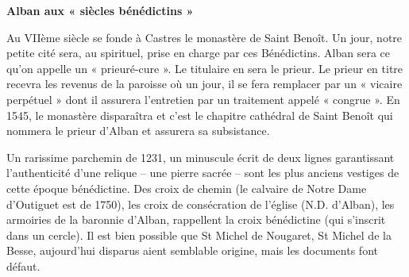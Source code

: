 
\thispagestyle{plain}

\vspace*{12mm}

\begin{center}
    {\Large\bfseries Alban aux « siècles bénédictins »}
\end{center}

\vspace{18mm}

\noindent
Au VIIème siècle se fonde à Castres le monastère de Saint Benoît.
Un jour, notre petite cité sera, au spirituel, prise en charge par
ces Bénédictins. Alban sera ce qu'on appelle un « prieuré-cure ».
Le titulaire en sera le prieur. Le prieur en titre recevra les revenus
de la paroisse où un jour, il se fera remplacer par un « vicaire
perpétuel » dont il assurera l'entretien par un traitement appelé
« congrue ». En 1545, le monastère disparaîtra et c'est le chapitre
cathédral de Saint Benoît qui nommera le prieur d'Alban et assurera
sa subsistance.

\par\vspace{12mm}

\noindent
Un rarissime parchemin de 1231, un minuscule écrit de deux lignes
garantissant l'authenticité d'une relique -- une pierre sacrée --
sont les plus anciens vestiges de cette époque bénédictine. Des croix
de chemin (le calvaire de Notre Dame d'Outiguet est de 1750), les
croix de consécration de l'église (N.D. d'Alban), les armoiries de
la baronnie d'Alban, rappellent la croix bénédictine (qui s'inscrit
dans un cercle). Il est bien possible que St Michel de Nougaret,
St Michel de la Besse, aujourd'hui disparus aient semblable origine,
mais les documents font défaut.

\vfill
